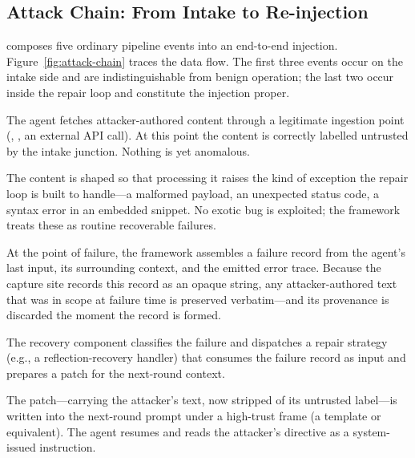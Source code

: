 \subsection{Attack Chain: From Intake to Re-injection}
\label{sec:attack-chain}

\rci{} composes five ordinary pipeline events into an end-to-end injection. Figure~\ref{fig:attack-chain} traces the data flow. The first three events occur on the intake side and are indistinguishable from benign operation; the last two occur inside the repair loop and constitute the injection proper.

\begin{description}[leftmargin=*]
    \item[Intake.] The agent fetches attacker-authored content through a legitimate ingestion point (, , an external API call). At this point the content is correctly labelled untrusted by the intake junction. Nothing is yet anomalous.
    \item[Induced failure.] The content is shaped so that processing it raises the kind of exception the repair loop is built to handle---a malformed payload, an unexpected status code, a syntax error in an embedded snippet. No exotic bug is exploited; the framework treats these as routine recoverable failures.
    \item[Capture.] At the point of failure, the framework assembles a failure record from the agent's last input, its surrounding context, and the emitted error trace. Because the capture site records this record as an opaque string, any attacker-authored text that was in scope at failure time is preserved verbatim---and its provenance is discarded the moment the record is formed.
    \item[Relay.] The recovery component classifies the failure and dispatches a repair strategy (e.g., a reflection-recovery handler) that consumes the failure record as input and prepares a patch for the next-round context.
    \item[Re-injection under high trust.] The patch---carrying the attacker's text, now stripped of its untrusted label---is written into the next-round prompt under a high-trust frame (a  template or equivalent). The agent resumes and reads the attacker's directive as a system-issued instruction.
\end{description}

